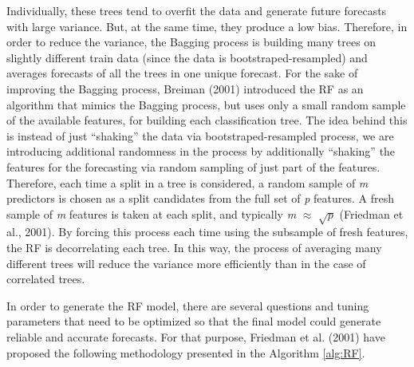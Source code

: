 \documentclass[]{elsarticle} %
\begin{document}
Individually, these trees tend to overfit the data and generate future
forecasts with large variance. But, at the same time, they produce a low
bias. Therefore, in order to reduce the variance, the Bagging process is
building many trees on slightly different train data (since the data is
bootstraped-resampled) and averages forecasts of all the trees in one
unique forecast. For the sake of improving the Bagging process, Breiman
(2001) introduced the RF as an algorithm that mimics the Bagging
process, but uses only a small random sample of the available features,
for building each classification tree. The idea behind this is instead
of just ``shaking'' the data via bootstraped-resampled process, we are
introducing additional randomness in the process by additionally
``shaking'' the features for the forecasting via random sampling of just
part of the features. Therefore, each time a split in a tree is
considered, a random sample of \emph{m} predictors is chosen as a split
candidates from the full set of \emph{p} features. A fresh sample of
\emph{m} features is taken at each split, and typically \emph{m}
\(\approx\) \(\sqrt p\) (Friedman et al., 2001). By forcing this process
each time using the subsample of fresh features, the RF is decorrelating
each tree. In this way, the process of averaging many different trees
will reduce the variance more efficiently than in the case of correlated
trees.

In order to generate the RF model, there are several questions and
tuning parameters that need to be optimized so that the final model
could generate reliable and accurate forecasts. For that purpose,
Friedman et al. (2001) have proposed the following methodology presented
in the Algorithm \ref{alg:RF}.
\end{document}
